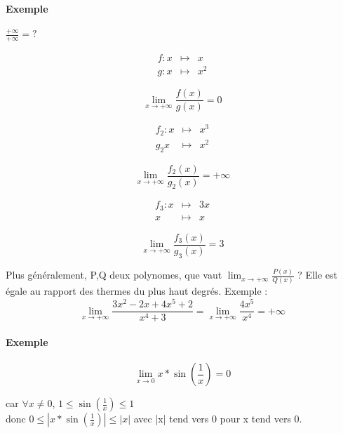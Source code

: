 \paragraph{Exemple} $\frac{+\infty}{+\infty} = ?$

\[\begin{array}{rcl}
	f:x & \mapsto & x \\
	g:x &\mapsto & x^2
\end{array}\]

\[\lim_{x \to +\infty} \frac{f(x)}{g(x)} = 0\]

\[\begin{array}{rcl}
	f_2:x &\mapsto & x^3 \\
	g_2x&\mapsto& x^2
\end{array}\]

\[\lim_{x \to +\infty} \frac{f_2(x)}{g_2(x)} = +\infty\]

\[\begin{array}{rcl}
	f_3:x &\mapsto & 3x \\
	x&\mapsto& x
\end{array}\]

\[\lim_{x \to +\infty} \frac{f_3(x)}{g_3(x)} = 3\]

Plus généralement, P,Q deux polynomes, que vaut $\lim_{x\to +\infty} \frac{P(x)}{Q(x)}$ ? Elle est égale au rapport des thermes du plus haut degrés.
Exemple : \[\lim_{x \to +\infty} \frac{3x^2 -2x + 4x^5 +2}{x^4+3} = \lim_{x \to +\infty} \frac{4x^5}{x^4} = +\infty\]

\paragraph{Exemple}
\[\lim_{x \to 0} x*\sin(\frac{1}{x}) = 0\]

car $\forall x \neq 0$, $1 \leq \sin(\frac{1}{x}) \leq 1$
~\\
donc $ 0 \leq |x*\sin(\frac{1}{x})| \leq |x|$ avec |x| tend vers 0 pour x tend vers 0.
